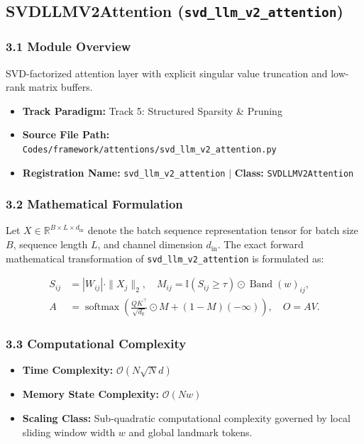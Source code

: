\subsection{SVDLLMV2Attention (\texttt{svd\_llm\_v2\_attention})}
\label{sec:app_module_svd_llm_v2_attention}

\subsubsection*{3.1 Module Overview}
SVD-factorized attention layer with explicit singular value truncation and low-rank matrix buffers.
\begin{itemize}
    \item \textbf{Track Paradigm:} Track 5: Structured Sparsity \& Pruning
    \item \textbf{Source File Path:} \texttt{Codes/framework/attentions/svd\_llm\_v2\_attention.py}
    \item \textbf{Registration Name:} \texttt{svd\_llm\_v2\_attention} $\mid$ \textbf{Class:} \texttt{SVDLLMV2Attention}
\end{itemize}

\subsubsection*{3.2 Mathematical Formulation}
Let $X \in \mathbb{R}^{B \times L \times d_{\text{in}}}$ denote the batch sequence representation tensor for batch size $B$, sequence length $L$, and channel dimension $d_{\text{in}}$. The exact forward mathematical transformation of \texttt{svd\_llm\_v2\_attention} is formulated as:

\begin{align}
S_{ij} &= |W_{ij}| \cdot \|X_j\|_2, \quad M_{ij} = \mathbb{I}(S_{ij} \ge \tau) \odot \operatorname{Band}(w)_{ij}, \\
A &= \operatorname{softmax}\left(\frac{Q K^\top}{\sqrt{d_k}} \odot M + (1 - M)(-\infty)\right), \quad O = A V.
\end{align}


\subsubsection*{3.3 Computational Complexity}
\begin{itemize}
    \item \textbf{Time Complexity:} $\mathcal{O}(N \sqrt{N} d)$
    \item \textbf{Memory State Complexity:} $\mathcal{O}(N w)$
    \item \textbf{Scaling Class:} Sub-quadratic computational complexity governed by local sliding window width $w$ and global landmark tokens.
\end{itemize}

